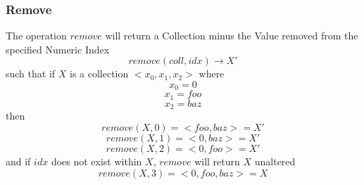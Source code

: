 \documentclass[../main.tex]{subfiles}
\begin{document}
\subsubsection{Remove}
The operation $remove$ will return a Collection minus the Value removed from the specified Numeric Index
$$remove(coll, idx) \to X'$$
such that if $X$ is a collection $<x_{0}, x_{1}, x_{2}>$
where
$$x_{0} = 0$$
$$x_{1} = foo$$
$$x_{2} = baz$$
then
$$remove(X, 0) = <foo, baz> = X'$$
$$remove(X, 1) = <0, baz> = X'$$
$$remove(X, 2) = <0, foo> = X'$$
and if $idx$ does not exist within $X$, $remove$ will return $X$ unaltered
$$remove(X, 3) = <0, foo, baz> = X$$
\end{document}
